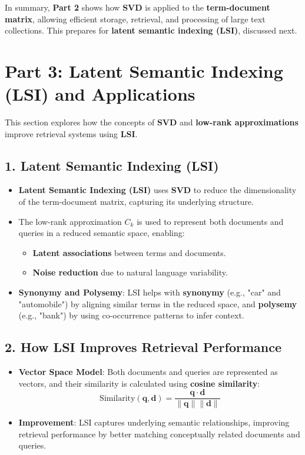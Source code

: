 \documentclass{article}
\begin{document}
In summary, \textbf{Part 2} shows how \textbf{SVD} is applied to the \textbf{term-document matrix}, allowing efficient storage, retrieval, and processing of large text collections. This prepares for \textbf{latent semantic indexing (LSI)}, discussed next.

\section*{Part 3: Latent Semantic Indexing (LSI) and Applications}

This section explores how the concepts of \textbf{SVD} and \textbf{low-rank approximations} improve retrieval systems using \textbf{LSI}.

\subsection*{1. Latent Semantic Indexing (LSI)}
\begin{itemize}
    \item \textbf{Latent Semantic Indexing (LSI)} uses \textbf{SVD} to reduce the dimensionality of the term-document matrix, capturing its underlying structure.
    \item The low-rank approximation \( C_k \) is used to represent both documents and queries in a reduced semantic space, enabling:
    \begin{itemize}
        \item \textbf{Latent associations} between terms and documents.
        \item \textbf{Noise reduction} due to natural language variability.
    \end{itemize}
    \item \textbf{Synonymy and Polysemy}: LSI helps with \textbf{synonymy} (e.g., "car" and "automobile") by aligning similar terms in the reduced space, and \textbf{polysemy} (e.g., "bank") by using co-occurrence patterns to infer context.
\end{itemize}

\subsection*{2. How LSI Improves Retrieval Performance}
\begin{itemize}
    \item \textbf{Vector Space Model}: Both documents and queries are represented as vectors, and their similarity is calculated using \textbf{cosine similarity}:
    \[
    \text{Similarity}(\mathbf{q}, \mathbf{d}) = \frac{\mathbf{q} \cdot \mathbf{d}}{\|\mathbf{q}\| \|\mathbf{d}\|}
    \]
    \item \textbf{Improvement}: LSI captures underlying semantic relationships, improving retrieval performance by better matching conceptually related documents and queries.
\end{itemize}
\end{document}
